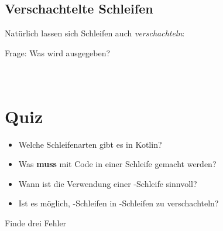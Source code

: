 \subsection{Verschachtelte Schleifen}
\begin{frame}
    \slidehead

    \vspace{-1.2ex}
    Natürlich lassen sich Schleifen auch \textit{verschachteln}:
    \vspace{-1.2ex}

    \pause
    \vspace{-1.5ex}
    \begin{block}{Frage: Was wird ausgegeben?}
        \\
        \\
        \\
    \end{block}
\end{frame}

\livecoding

\section{Quiz}
\begin{frame}
    \slidehead
    \pause
    \begin{itemize}
        \item Welche Schleifenarten gibt es in Kotlin?\pause
        \item Was \textbf{muss} mit Code in einer Schleife gemacht werden?\pause
        \item Wann ist die Verwendung einer -Schleife sinnvoll?\pause
        \item Ist es möglich, -Schleifen in -Schleifen zu verschachteln?\pause
    \end{itemize}
    \begin{block}{Finde drei Fehler}
    \end{block}
\end{frame}


